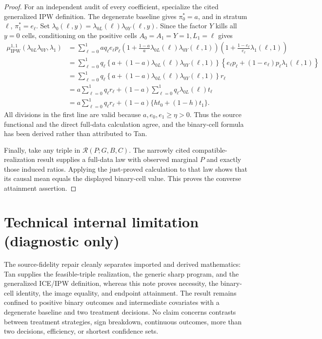 \documentclass{article}
\begin{document}
\begin{proof}
For an independent audit of every coefficient, specialize the cited generalized IPW definition. The degenerate baseline gives \(\pi_0^*=a\), and in stratum \(\ell\), \(\pi_1^*=e_\ell\). Set \(\lambda_0(\ell,y)=\lambda_{0L}(\ell)\lambda_{0Y}(\ell,y)\). Since the factor \(Y\) kills all \(y=0\) cells, conditioning on the positive cells \(A_0=A_1=Y=1,L_1=\ell\) gives
\[
\begin{aligned}
\mu^{1,1}_{\mathrm{IPW}}(\lambda_{0L}\lambda_{0Y},\lambda_1)
&=\sum_{\ell=0}^1 a q_\ell e_\ell p_\ell
 \left(1+\frac{1-a}{a}\lambda_{0L}(\ell)\lambda_{0Y}(\ell,1)\right)
 \left(1+\frac{1-e_\ell}{e_\ell}\lambda_1(\ell,1)\right)\\
&=\sum_{\ell=0}^1q_\ell
 \left\{a+(1-a)\lambda_{0L}(\ell)\lambda_{0Y}(\ell,1)\right\}
 \left\{e_\ell p_\ell+(1-e_\ell)p_\ell\lambda_1(\ell,1)\right\}\\
&=\sum_{\ell=0}^1q_\ell
 \left\{a+(1-a)\lambda_{0L}(\ell)\lambda_{0Y}(\ell,1)\right\}r_\ell\\
&=a\sum_{\ell=0}^1q_\ell r_\ell
 +(1-a)\sum_{\ell=0}^1q_\ell\lambda_{0L}(\ell)t_\ell\\
&=a\sum_{\ell=0}^1q_\ell r_\ell
 +(1-a)\{h t_0+(1-h)t_1\}.
\end{aligned}
\]
All divisions in the first line are valid because \(a,e_0,e_1\geq\eta>0\). Thus the source functional and the direct full-data calculation agree, and the binary-cell formula has been derived rather than attributed to Tan.

Finally, take any triple in \(\mathcal R(P;G,B,C)\). The narrowly cited compatible-realization result supplies a full-data law with observed marginal \(P\) and exactly those induced ratios. Applying the just-proved calculation to that law shows that its causal mean equals the displayed binary-cell value. This proves the converse attainment assertion.
\end{proof}

\section*{Technical internal limitation (diagnostic only)}

The source-fidelity repair cleanly separates imported and derived mathematics: Tan supplies the feasible-triple realization, the generic sharp program, and the generalized ICE/IPW definition, whereas this note proves necessity, the binary-cell identity, the image equality, and endpoint attainment. The result remains confined to positive binary outcomes and intermediate covariates with a degenerate baseline and two treatment decisions. No claim concerns contrasts between treatment strategies, sign breakdown, continuous outcomes, more than two decisions, efficiency, or shortest confidence sets.
\end{document}
